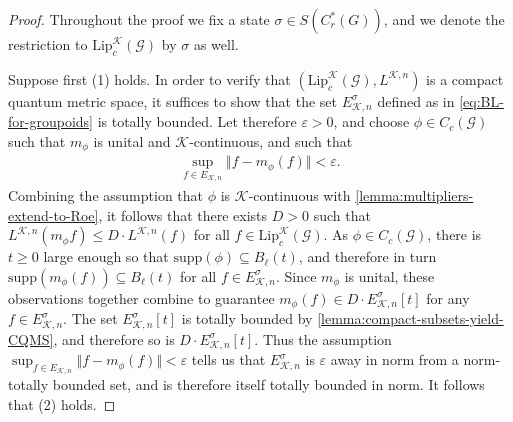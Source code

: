 \documentclass[11pt,a4paper,oneside,final,reqno]{amsart}
\theoremstyle{definition}
\newcommand{\G}{\mathcal{G}}
\newcommand{\cK}{\mathcal{K}}
\newcommand{\supp}{\mathrm{supp}}
\newcommand{\Lip}{\mathrm{Lip}}
\newcommand{\Cred}{C_{r}^{*}}
\numberwithin{equation}{section}
\begin{document}
	\begin{proof}
		Throughout the proof we fix a state $\sigma \in S(\Cred(G))$, and we denote the restriction to  $\Lip_c^{\cK}(\G)$ by $\sigma$ as well. 
		
		Suppose first (1) holds. In order to verify that $( \Lip_c^{\cK}(\G), L^{\cK,n})$ is a compact quantum metric space, it suffices to show that the set $E^\sigma_{\cK, n}$ defined as in \eqref{eq:BL-for-groupoids} is totally bounded. 
		Let therefore $\varepsilon > 0$, and choose 
		$\phi \in C_c(\G)$ 
		such that
		$m_\phi$ is unital and $\cK$-continuous, and such that
		\begin{align*}
			\sup_{f\in E_{\cK, n}} \Vert f - m_{\phi}(f) \Vert < \varepsilon.
		\end{align*}
		Combining the assumption that $\phi$ is $\cK$-continuous with \cref{lemma:multipliers-extend-to-Roe}, it follows that there exists $D >0$ such that $L^{\cK,n}(m_\phi f) \leq D \cdot L^{\cK,n}(f)$ for all 
		$f \in \Lip_c^{\cK}(\G)$. 
		As $\phi \in C_c(\G)$, there is $t \geq 0$ large enough so that $\supp(\phi) \subseteq B_\ell(t)$, and therefore in turn $\supp (m_\phi (f)) \subseteq B_\ell(t)$ for all 
		$f \in E^\sigma_{\cK, n}$.
		Since  
		$m_\phi$ is unital, 
		these observations together combine
		to guarantee 
		$m_{\phi}(f) \in D \cdot E^\sigma_{\cK, n}[t]$ for any $f \in E^\sigma_{\cK, n}$.
		The set 
		$E^\sigma_{\cK, n}[t]$
		is totally bounded by \cref{lemma:compact-subsets-yield-CQMS},  
		and therefore so is 
		$D \cdot E^\sigma_{\cK, n}[t]$.
		Thus the assumption $\sup_{f\in E_{\cK,n}} \Vert f - m_{\phi}(f) \Vert < \varepsilon$ tells us that 
		$E^\sigma_{\cK, n}$ 
		is $\varepsilon$ away in norm from a norm-totally bounded set, and is therefore itself totally bounded in norm. It follows that (2) holds. 
		

\end{proof}
\end{document}
